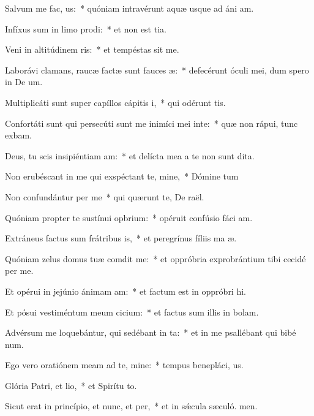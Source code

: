 \item Salvum me fac, us:~* quóniam intravérunt aquæ usque ad áni am.
\item Infíxus sum in limo prodi:~* et non est tia.
\item Veni in altitúdinem ris:~* et tempéstas sit me.
\item Laborávi clamans, raucæ factæ sunt fauces æ:~* defecérunt óculi mei, dum spero in De um.
\item Multiplicáti sunt super capíllos cápitis i,~* qui odérunt  tis.
\item Confortáti sunt qui persecúti sunt me inimíci mei inte:~* quæ non rápui, tunc exbam.
\item Deus, tu scis insipiéntiam am:~* et delícta mea a te non sunt dita.
\item Non erubéscant in me qui exspéctant te, mine,~* Dómine tum
\item Non confundántur per me~* qui quærunt te, De raël.
\item Quóniam propter te sustínui opbrium:~* opéruit confúsio fáci am.
\item Extráneus factus sum frátribus is,~* et peregrínus fíliis ma æ.
\item Quóniam zelus domus tuæ comdit me:~* et oppróbria exprobrántium tibi cecidé per me.
\item Et opérui in jejúnio ánimam am:~* et factum est in oppróbri hi.
\item Et pósui vestiméntum meum cicium:~* et factus sum illis in bolam.
\item Advérsum me loquebántur, qui sedébant in ta:~* et in me psallébant qui bibé num.
\item Ego vero oratiónem meam ad te, mine:~* tempus benepláci, us.
\item Glória Patri, et lio,~* et Spirítu to.
\item Sicut erat in princípio, et nunc, et per,~* et in sǽcula sæculó. men.
